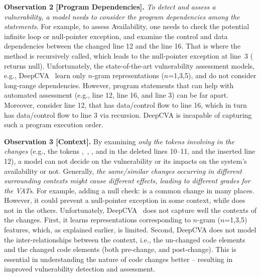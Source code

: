 \vspace{2pt}
{\bf Observation 2 [Program Dependencies].}  {\em To detect
  and assess a vulnerability, a model needs to consider the program
  dependencies among the statements}. For example, to assess
Availability, one needs to check the potential infinite loop or
null-pointer exception, and examine the control and data dependencies
between the changed line 12 and the line 16. That is where the method
 is recursively called, which leads to the null-pointer
exception at line~3 ( returns
null). Unfortunately, the state-of-the-art vulnerability assessment
models, e.g., DeepCVA~\cite{deepCVA-ase21} learn only $n$-gram representations ($n$=1,3,5),
and do not consider long-range dependencies. However, program statements that can help with
automated assessment (e.g., line 12, line 16, and line 3) can be far apart.
Moreover, consider line 12, that has data/control flow to line 16, which in turn has data/control flow to line 3 via recursion.
DeepCVA is incapable of capturing such a program execution order.

\vspace{2pt}
{\bf Observation 3 [Context].} By examining {\em only the
  tokens involving in the changes} (e.g., the tokens
,~, , and
 in the deleted lines 10--11, and the inserted line 12),
a model can not decide on the vulnerability or its impacts on the
system's availability or not. Generally, {\em the same/similar changes
  occurring in different surrounding contexts might cause different
  effects, leading to different grades for the VATs}. For example,
adding a null check:  is a common change in many
places. However, it could prevent a null-pointer exception in some
context, while does not in the others.
Unfortunately, DeepCVA~\cite{deepCVA-ase21} does not capture well the
contexts of the changes. First, it learns representations corresponding to $n$-gram ($n$=1,3,5) features, which, as explained earlier, is limited. Second, DeepCVA does not model the inter-relationships
between the context, i.e., the un-changed code elements and the changed code elements (both pre-change, and post-change).
This is essential in understanding the nature of code changes better -- resulting in improved vulnerability detection and assessment.

